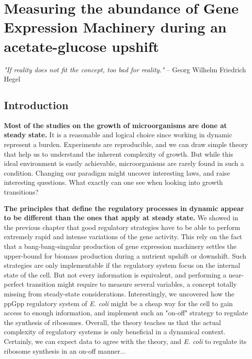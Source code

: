 \chapter{Measuring the abundance of Gene Expression Machinery during an acetate-glucose upshift}
\label{chap:experiments}

\textit{"If reality does not fit the concept, too bad for reality."} -- Georg Wilhelm Friedrich Hegel

\section{Introduction}

\textbf{Most of the studies on the growth of microorganisms are done at steady state.}
It is a reasonable and logical choice since working in dynamic represent a burden.
Experiments are reproducible, and we can draw simple theory that help us to understand the inherent complexity of growth.
But while this ideal environment is easily achievable, microorganisms are rarely found in such a condition.
Changing our paradigm might uncover interesting laws, and raise interesting questions.
What exactly can one see when looking into growth transitions?

\textbf{The principles that define the regulatory processes in dynamic appear to be different than the ones that apply at steady state.}
We showed in the previous chapter that good regulatory strategies have to be able to perform extremely rapid and intense variations of the gene activity.
This rely on the fact that a bang-bang-singular production of gene expression machinery settles the upper-bound for biomass production during a nutrient upshift or downshift.
Such strategies are only implementable if the regulatory system focus on the internal state of the cell.
But not every information is equivalent, and performing a near-perfect transition might require to measure several variables, a concept totally missing from steady-state considerations.
Interestingly, we uncovered how the ppGpp regulatory system of \textit{E. coli} might be a cheap way for the cell to gain access to enough information, and implement such an "on-off" strategy to regulate the synthesis of ribosomes.
Overall, the theory teaches us that the actual complexity of regulatory systems is only beneficial in a dynamical context.
Certainly, we can expect data to agree with the theory, and \textit{E. coli} to regulate its ribosome synthesis in an on-off manner...

